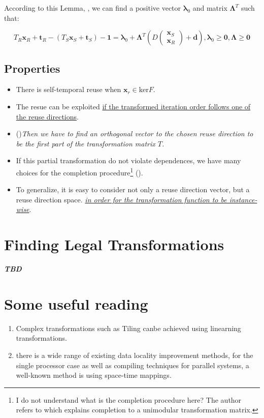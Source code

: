 According to this Lemma, {\color{red}{for each edge in the dependence graph}},
we can find a positive vector $\bm{\lambda}_0$ and matrix $\bm{\Lambda}^T$ such that:

\begin{equation}
  T_R\bm{x}_R+\bm{t}_R - (T_S\bm{x}_S+\bm{t}_S) -\bm{1} = \bm{\lambda}_0 +
  \bm{\Lambda}^T \left( D \left( \begin{matrix}\bm{x}_S \\ \bm{x}_R \end{matrix} \right) + \bm{d} \right),
  \bm{\lambda}_0 \ge \bm{0}, \bm{\Lambda} \ge \bm{0}
\end{equation}

\subsection{Properties}

\begin{itemize}
  \item There is self-temporal reuse when $\bm{x}_r \in \text{ker}F$.
  \item The resue can be exploited \underline{if the transformed
  iteration order follows one of the reuse directions}.
  \item ({})\emph{Then we have to find an orthogonal
  vector to the chosen reuse direction to be the first part of the transformation
  matrix $T$.}
  \item If this partial transformation do not violate dependences, we have many choices
  for the completion procedure\footnote{I do not understand what is the completion
  procedure here? The author refers to \cite{griebl1998code} which explains completion
  to a unimodular transformation matrix.} ({}).
  \item To generalize, it is easy to consider not only a reuse direction vector,
  but a reuse direction space.
  \underline{\emph{in order for the transformation function to be instance-wise}}.
\end{itemize}

\section{Finding Legal Transformations}

\textbf{\textit{TBD}}


\section{Some useful reading}
\begin{enumerate}
  \item Complex transformations such as Tiling canbe achieved using linearning transformations\cite{xue1997tiling}.
  \item there is a wide range of existing data locality improvement methods,
  for the single processor case as well as compiling techniques for parallel
  systems, a well-known method is using space-time mappings\cite{lengauer1993loop}.
\end{enumerate}
